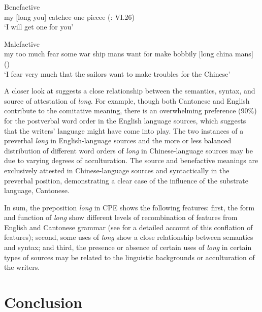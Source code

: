 \documentclass[english,output=paper,colorlinks,citecolor=brown]{../langscibook}
\begin{document}
\ex%
    \label{ex:7:8}
Benefactive\\
my [long you] catchee one piecee (\citealt{Tong1862}: VI.26)\\
\glt ‘I will get one for you’ 

\ex Malefactive\\\label{ex:7:9}
my too much fear some war ship mans want for make bobbily [long china mans] (\citealt[968]{Tilden1834})\\
\glt ‘I fear very much that the sailors want to make troubles for the Chinese’
\z
    
A closer look at  suggests a close relationship between the semantics, syntax, and source of attestation of \textit{long}. For example, though both Cantonese and English contribute to the comitative meaning, there is an overwhelming preference (90\%) for the postverbal word order in the English language sources, which suggests that the writers’ language might have come into play. The two instances of a preverbal \textit{long} in English-language sources and the more or less balanced distribution of different word orders of \textit{long} in Chinese-language sources may be due to varying degrees of acculturation. The source and benefactive meanings are exclusively attested in Chinese-language sources and syntactically in the preverbal position, demonstrating a clear case of the influence of the substrate language, Cantonese. 

In sum, the preposition \textit{long} in CPE shows the following features: first, the form and function of \textit{long} show different levels of recombination of features from English and Cantonese grammar (see \citealt{Li2011} for a detailed account of this conflation of features); second, some uses of \textit{long} show a close relationship between semantics and syntax; and third, the presence or absence of certain uses of \textit{long} in certain types of sources may be related to the linguistic backgrounds or acculturation of the writers.

\section{Conclusion}\label{sec:7:6}
\end{document}

